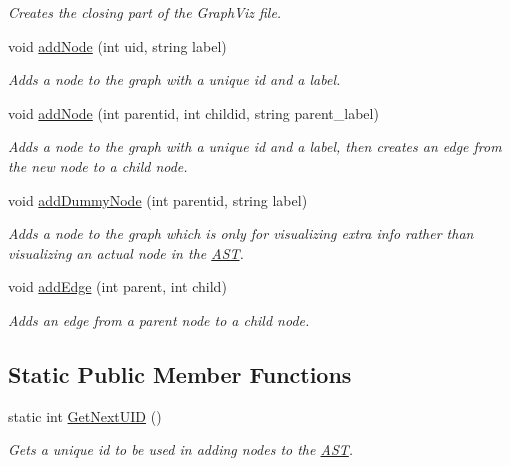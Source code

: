\begin{DoxyCompactItemize}
\begin{DoxyCompactList}\small\item\em Creates the closing part of the Graph\-Viz file. \end{DoxyCompactList}\item 
void \hyperlink{classVisualizer_a07370d04b5c04c37c001094d8dea1a19}{add\-Node} (int uid, string label)
\begin{DoxyCompactList}\small\item\em Adds a node to the graph with a unique id and a label. \end{DoxyCompactList}\item 
void \hyperlink{classVisualizer_a24387730bdf8579f07ef7760b5c4fe83}{add\-Node} (int parentid, int childid, string parent\-\_\-label)
\begin{DoxyCompactList}\small\item\em Adds a node to the graph with a unique id and a label, then creates an edge from the new node to a child node. \end{DoxyCompactList}\item 
void \hyperlink{classVisualizer_a135921c797363c4778a16ba0b0ee5e93}{add\-Dummy\-Node} (int parentid, string label)
\begin{DoxyCompactList}\small\item\em Adds a node to the graph which is only for visualizing extra info rather than visualizing an actual node in the \hyperlink{classAST}{A\-S\-T}. \end{DoxyCompactList}\item 
void \hyperlink{classVisualizer_a84454739e84577863200833d99de5976}{add\-Edge} (int parent, int child)
\begin{DoxyCompactList}\small\item\em Adds an edge from a parent node to a child node. \end{DoxyCompactList}\end{DoxyCompactItemize}
\subsection*{Static Public Member Functions}
\begin{DoxyCompactItemize}
\item 
static int \hyperlink{classVisualizer_a300cf71187da1d6d3feab998fb805991}{Get\-Next\-U\-I\-D} ()
\begin{DoxyCompactList}\small\item\em Gets a unique id to be used in adding nodes to the \hyperlink{classAST}{A\-S\-T}. \end{DoxyCompactList}\end{DoxyCompactItemize}
